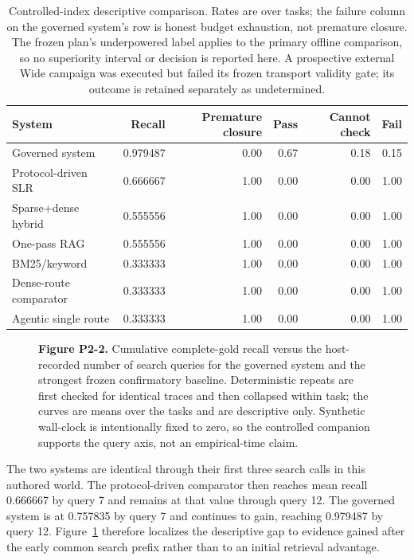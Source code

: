 \begin{table}[t]
\centering
\small
\begin{tabular}{lrrrrr}
\hline
System & Recall & Premature closure & Pass & Cannot check & Fail \\
\hline
Governed system & 0.979487 & 0.00 & 0.67 & 0.18 & 0.15 \\
Protocol-driven SLR & 0.666667 & 1.00 & 0.00 & 0.00 & 1.00 \\
Sparse+dense hybrid & 0.555556 & 1.00 & 0.00 & 0.00 & 1.00 \\
One-pass RAG & 0.555556 & 1.00 & 0.00 & 0.00 & 1.00 \\
BM25/keyword & 0.333333 & 1.00 & 0.00 & 0.00 & 1.00 \\
Dense-route comparator & 0.333333 & 1.00 & 0.00 & 0.00 & 1.00 \\
Agentic single route & 0.333333 & 1.00 & 0.00 & 0.00 & 1.00 \\
\hline
\end{tabular}
\caption{Controlled-index descriptive comparison.  Rates are over \OfflineTaskCount{} tasks;
the failure column on the governed system's row is honest budget exhaustion, not
premature closure.  The frozen plan's underpowered label applies to the primary
offline comparison, so no superiority interval or decision is reported here.  A
prospective external Wide campaign was executed but failed its frozen transport
validity gate; its outcome is retained separately as undetermined.}
\label{tab:p2-offline-main}
\end{table}

\begin{figure}[t]
\centering

\caption{\textbf{Figure P2-2.} Cumulative complete-gold recall versus the
host-recorded number of search queries for the governed system and the strongest
frozen confirmatory baseline.  Deterministic repeats are first checked for identical
traces and then collapsed within task; the curves are means over the \OfflineTaskCount{} tasks
and are descriptive only.  Synthetic wall-clock is intentionally fixed to zero,
so the controlled companion supports the query axis, not an empirical-time
claim.}
\label{fig:p2-2}
\end{figure}

The two systems are identical through their first three search calls in this
authored world.  The protocol-driven comparator then reaches mean recall
0.666667 by query 7 and remains at that value through query 12.  The governed
system is at 0.757835 by query 7 and continues to gain, reaching 0.979487 by
query 12.
Figure~\ref{fig:p2-2} therefore localizes the descriptive gap to evidence gained
after the early common search prefix rather than to an initial retrieval
advantage.

